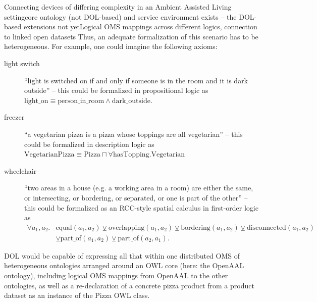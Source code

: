 \documentclass[10pt,%
\ifpretendfinal
final%
\else
draft%
\fi,
]{scrreprt}
\makeatletter
\newcommand*{\eg}{e.g.\@\xspace}
\makeatother
\begin{document}
\begin{usecase}{Connecting devices of differing complexity in an Ambient Assisted Living setting}{core ontology (not DOL-based) and service environment exists – the DOL-based extensions not yet}{Logical OMS mappings across different logics, connection to linked open datasets}
  Thus, an adequate formalization of this scenario has to be heterogeneous.  For example, one could imagine the following axioms:
  \begin{description}
  \item[light switch] ``light is switched on if and only if someone is in the room and it is dark outside'' – this could be formalized in propositional logic as $\mathrm{light\_on}\equiv\mathrm{person\_in\_room}\wedge\mathrm{dark\_outside}$.
  \item[freezer] ``a vegetarian pizza is a pizza whose toppings are all vegetarian'' – this could be formalized in description logic as $\mathrm{VegetarianPizza}\equiv\mathrm{Pizza}\sqcap \forall \mathrm{hasTopping}.\mathrm{Vegetarian}$
  \item[wheelchair] ``two areas in a house (\eg a working area in a room) are either the same, or intersecting, or bordering, or separated, or one is part of the other'' – this could be formalized as an RCC-style spatial calculus in first-order logic as $$\begin{array}{ll}\forall a_1, a_2 . & \mathrm{equal}(a_1, a_2) \veebar \mathrm{overlapping}(a_1, a_2) \veebar \mathrm{bordering}(a_1, a_2) \veebar \mathrm{disconnected}(a_1, a_2) \\
&\veebar \mathrm{part\_of}(a_1, a_2) \veebar \mathrm{part\_of}(a_2, a_1).\end{array}$$
  \end{description}
  
  DOL would be capable of expressing all that within one distributed OMS of heterogeneous ontologies arranged around an OWL core (here: the OpenAAL ontology), including logical OMS mappings from OpenAAL to the other ontologies, as well as a re-declaration of a concrete pizza product from a product dataset as an instance of the Pizza OWL class.
\end{usecase}
\end{document}
